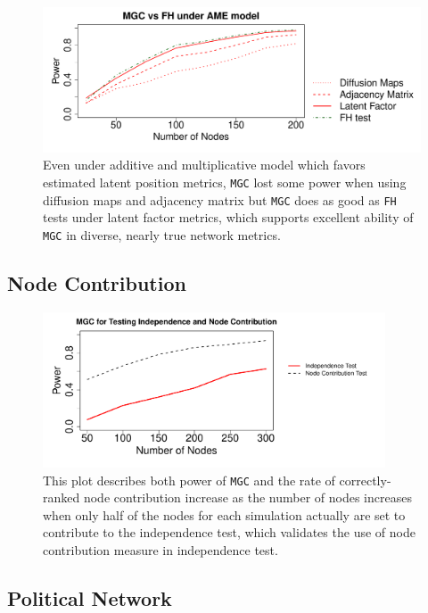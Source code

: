 \documentclass[12pt]{article}
\begin{document}
\begin{figure}[H]
	\centering
	\includegraphics[width=6in]{../Figure/ame_part.pdf}
	\caption{Even under additive and multiplicative model which favors estimated latent position metrics, \texttt{MGC} lost some power when using diffusion maps and adjacency matrix but \texttt{MGC} does as good as \texttt{FH} tests under latent factor metrics, which supports excellent ability of \texttt{MGC} in diverse, nearly true network metrics.}
	\label{fig:ame}
\end{figure}	


\subsection*{Node Contribution}

\begin{figure}
	\centering
	\includegraphics[width=4in]{../Figure/nodecontri.pdf}
	\caption{This plot describes both power of \texttt{MGC} and the rate of correctly-ranked node contribution increase as the number of nodes increases when only half of the nodes for each simulation actually are set to contribute to the independence test, which validates the use of node contribution measure in independence test.}
	\label{fig:contribution}
\end{figure}


\subsection*{Political Network}
\end{document}
